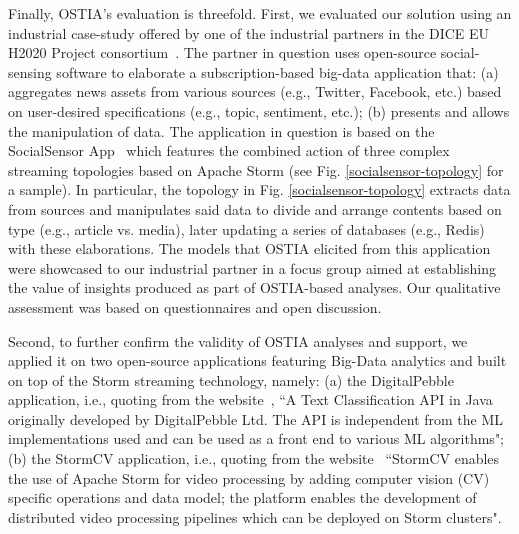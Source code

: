 Finally, OSTIA's evaluation is threefold.  First, we evaluated our solution
using an industrial case-study offered by one of the industrial partners in the
DICE EU H2020 Project consortium~\cite{dice2020}.
The
partner in question uses open-source social-sensing software to elaborate a
subscription-based big-data application that: (a) aggregates news assets from
various sources (e.g., Twitter, Facebook, etc.) based on user-desired
specifications (e.g., topic, sentiment, etc.); (b) presents and allows the
manipulation of data. The application in question is based on the SocialSensor
App~\cite{socialsensor}
which features the combined
action of three complex streaming topologies based on Apache Storm (see
Fig. \ref{socialsensor-topology} for a sample).  In particular, the topology in
Fig. \ref{socialsensor-topology} extracts data from sources and manipulates said
data to divide and arrange contents based on type (e.g., article vs. media),
later updating a series of databases (e.g., Redis) with these elaborations. The
models that OSTIA elicited from this application were showcased to our
industrial partner in a focus group aimed at establishing the value of insights
produced as part of OSTIA-based analyses. Our qualitative assessment was based
on questionnaires and open discussion.

Second, to further confirm the validity of OSTIA analyses and support, we
applied it on two open-source applications featuring Big-Data analytics and
built on top of the Storm streaming technology, namely: (a) the DigitalPebble
application, i.e., quoting from the
website~\cite{storm-crawler},
``A
Text Classification API in Java originally developed by DigitalPebble Ltd. The
API is independent from the ML implementations used and can be used as a front
end to various ML algorithms"; (b) the StormCV application, i.e., quoting from
the website~\cite{stormCV}
``StormCV
enables the use of Apache Storm for video processing by adding computer vision
(CV) specific operations and data model; the platform enables the development of
distributed video processing pipelines which can be deployed on Storm clusters".


